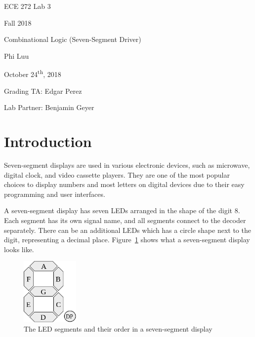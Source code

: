 \documentclass[12pt]{article}
\begin{document}
\begin{titlepage}
  \begin{center} \LARGE
    \vspace*{1.5in}

    ECE 272 Lab 3

    Fall 2018

    \vfill

    Combinational Logic (Seven-Segment Driver)

    Phi Luu

    \vfill

    October 24\textsuperscript{th}, 2018

    Grading TA: Edgar Perez

    Lab Partner: Benjamin Geyer

    \vspace{1.5in}
  \end{center}
\end{titlepage}

\section{Introduction}

Seven-segment displays are used in various electronic devices, such as microwave, digital clock, and video cassette players. They are one of the most popular choices to display numbers and most letters on digital devices due to their easy programming and user interfaces.

A seven-segment display has seven LEDs arranged in the shape of the digit 8. Each segment has its own signal name, and all segments connect to the decoder separately. There can be an additional LEDs which has a circle shape next to the digit, representing a decimal place. Figure~\ref{figure:1} shows what a seven-segment display looks like.

\begin{figure}[ht]
  \centering
  \includegraphics[width=0.25\textwidth]{seven_segment_display.png}
  \caption{The LED segments and their order in a seven-segment display\cite{WikimediaSevenSegment}}
  \label{figure:1}
\end{figure}
\end{document}
